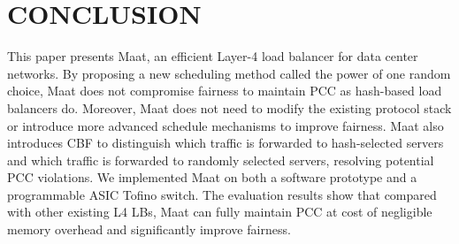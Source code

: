 \section{CONCLUSION}
This paper presents Maat, an efficient Layer-4 load balancer for data center networks. By proposing a new scheduling method called the power of one random choice, Maat does not compromise fairness to maintain PCC as hash-based load balancers do. Moreover, Maat does not need to modify the existing protocol stack or introduce more advanced schedule mechanisms to improve fairness. Maat also introduces CBF to distinguish which traffic is forwarded to hash-selected servers and which traffic is forwarded to randomly selected servers, resolving potential PCC violations. We implemented Maat on both a software prototype and a programmable ASIC Tofino switch. The evaluation results show that compared with other existing L4 LBs, Maat can fully maintain PCC at cost of negligible memory overhead and significantly improve fairness.